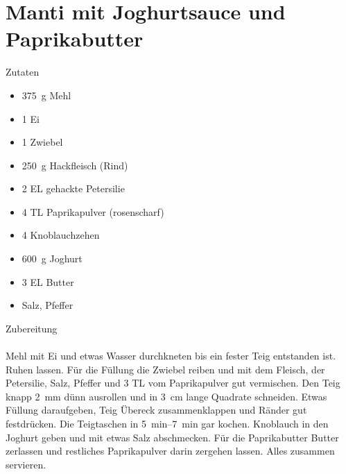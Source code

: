 \section*{Manti mit Joghurtsauce und Paprikabutter}
\ihead{}\ohead{}
\cfoot{}
{\Large Zutaten}
\begin{multicols}{2}
\begin{itemize}
    \item \SI{375}{g} Mehl
    \item \num{1} Ei
    \item \num{1} Zwiebel
    \item \SI{250}{g} Hackfleisch (Rind)
    \item \num{2} EL gehackte Petersilie
    \item \num{4} TL Paprikapulver (rosenscharf)
    \item \num{4} Knoblauchzehen
    \item \SI{600}{g} Joghurt
    \item \num{3} EL Butter
    \item Salz, Pfeffer
\end{itemize}
\end{multicols}
\noindent
{\Large Zubereitung}\\
\\
Mehl mit Ei und etwas Wasser durchkneten bis ein fester Teig entstanden ist.
Ruhen lassen.
Für die Füllung die Zwiebel reiben und mit dem Fleisch, der Petersilie, Salz, Pfeffer und \num{3} TL vom Paprikapulver gut vermischen.
Den Teig knapp \SI{2}{mm} dünn ausrollen und in \SI{3}{cm} lange Quadrate schneiden.
Etwas Füllung daraufgeben, Teig Übereck zusammenklappen und Ränder gut festdrücken.
Die Teigtaschen in \SIrange{5}{7}{min} gar kochen.
Knoblauch in den Joghurt geben und mit etwas Salz abschmecken.
Für die Paprikabutter Butter zerlassen und restliches Paprikapulver darin zergehen lassen.
Alles zusammen servieren. 